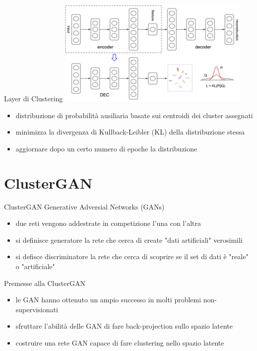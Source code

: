 \documentclass{beamer}
\begin{document}
\begin{frame}{Layer di Clustering}
	\centering
	\includegraphics[width=0.7\textwidth, keepaspectratio]{./images/UDE_model.png}
	\begin{itemize}
		\item distribuzione di probabilità ausiliaria basate sui centroidi dei cluster assegnati
		\item minimizza la divergenza di Kullback-Leibler (KL) della distribuzione stessa
		\item aggiornare dopo un certo numero di epoche la distribuzione
	\end{itemize}
	\end{frame}

\section{ClusterGAN}

\begin{frame}{ClusterGAN}
	Generative Adversial Networks (GANs)
	\begin{itemize}
		\item due reti vengono addestrate in competizione l'una con l'altra
		\item si definisce generatore la rete che cerca di create "dati artificiali" verosimili
		\item si defisce discriminatore la rete che cerca di scoprire se il set di dati è "reale" o "artificiale"
	\end{itemize}
	Premesse alla ClusterGAN\cite{DBLP:journals/corr/abs-1809-03627}
	\begin{itemize}
		\item le GAN hanno ottenuto un ampio successo in molti problemi non-supervisionati
		\item sfruttare l'abilità delle GAN di fare back-projection sullo spazio latente
		\item costruire una rete GAN capace di fare clustering nello spazio latente
	\end{itemize}
\end{frame}
\end{document}
